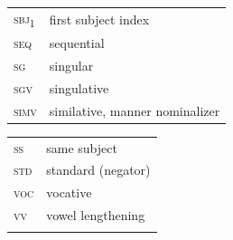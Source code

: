\documentclass[output=paper,colorlinks,citecolor=brown,draftmode
]{langscibook}
\begin{document}
\begin{tabularx}{.54\textwidth}{ll}
\textsc{sbj\textsubscript{1}} &	first subject index\\
\textsc{seq} & sequential\\
\textsc{sg} & singular\\
\textsc{sgv} &	singulative\\
\textsc{simv} & similative, manner nominalizer\\
\end{tabularx}
\begin{tabularx}{.4\textwidth}{ll}
\textsc{ss} & same subject\\
\textsc{std} &	standard (negator)\\
\textsc{voc} & vocative\\
\textsc{vv} & vowel lengthening\\
\\
\end{tabularx}

\printbibliography[heading=subbibliography,notkeyword=this]
\end{document}
